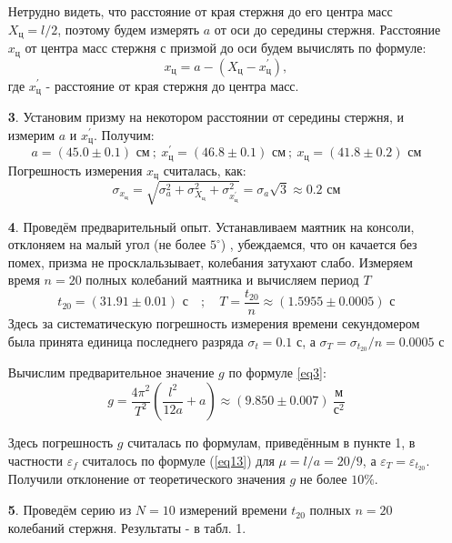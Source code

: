 \documentclass[a4paper]{article}
\begin{document}
\begin{itemize}
Нетрудно видеть, что расстояние от края стержня до его центра масс $X_{\text{ц}} = l/2$, поэтому будем измерять $a$ от оси до середины стержня. Расстояние $x_{\text{ц}}$ от центра масс стержня с призмой до оси будем вычислять по формуле:
\begin{equation}
x_{\text{ц}} = a - (X_{\text{ц}} - x^{'}_{\text{ц}}),
\end{equation}
где $x^{'}_{\text{ц}}$ - расстояние от края стержня до центра масс.
\item[\textbf{3}.] Установим призму на некотором расстоянии от середины стержня, и измерим $a$ и $x^{'}_{\text{ц}}$. Получим:
\[a = (45.0  \pm  0.1) \text{ см} \ ; \ x^{'}_{\text{ц}} = (46.8  \pm  0.1) \text{ см} \ ; \ x_{\text{ц}} = (41.8  \pm  0.2) \text{ см}\]
Погрешность измерения $x_{\text{ц}}$ считалась, как:
\begin{equation}
\sigma_{x_{\text{ц}}} = \sqrt{\sigma_a^2 + \sigma_{X_{\text{ц}}}^2 + \sigma_{{x^{'}_{\text{ц}}}}^2} =  \sigma_a \sqrt{3} \approx 0.2 \text{ см}
\end{equation}
\item[\textbf{4}.] Проведём предварительный опыт. Устанавливаем маятник на консоли, отклоняем на малый угол (не более $5^{\circ}$) , убеждаемся, что он качается без помех, призма не просклальзывает, колебания затухают слабо. Измеряем время $n=20$ полных колебаний маятника и вычисляем период $T$ \[t_{20} = (31.91  \pm  0.01) \text{ с} \quad ; \quad T = \frac{t_{20}}{n} \approx (1.5955 \pm 0.0005) \text{ с}\]
Здесь за систематическую погрешность измерения времени секундомером была принята единица последнего разряда $\sigma_t = 0.1 \text{ с}$, а $\sigma_T = \sigma_{t_{20}}/n = 0.0005 \text{ с}$

\noindent
Вычислим предварительное значение $g$ по формуле \eqref{eq3}:
\begin{equation}
g = \frac{4\pi^2}{T^2} \left(\frac{l^2}{12a} + a\right) \approx (9.850 \pm 0.007) \ \frac{\text{м}}{\text{с}^2}
\end{equation}

\noindent
Здесь погрешность $g$ считалась по формулам, приведённым в пункте 1, в частности $\varepsilon_f$ считалось по формуле (\ref{eq13}) для $\mu = l/a = 20/9$, а $\varepsilon_T = \varepsilon_{t_{20}}$. Получили отклонение от теоретического значения $g$ не более $10\%$.

\item[\textbf{5}.] Проведём серию из $N = 10$ измерений времени $t_{20}$ полных $n = 20$ колебаний стержня. Результаты - в табл. 1.



\end{itemize}
\end{document}
